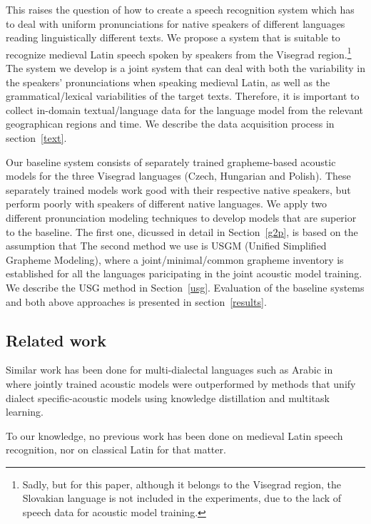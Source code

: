 \documentclass[runningheads,a4paper]{llncs}
\begin{document}
This raises the question of how to create a speech recognition system which has to deal with uniform pronunciations for native speakers of different languages reading linguistically different texts.
We propose a system that is suitable to recognize medieval Latin speech spoken by speakers from the Visegrad region.\footnote{Sadly, but for this paper, although it belongs to the Visegrad region, the Slovakian language is not included in the experiments, due to the lack of speech data for acoustic model training.}
The system we develop is a joint system that can deal with both the variability in the speakers' pronunciations when speaking medieval Latin, as well as the grammatical/lexical variabilities of the target texts.
Therefore, it is important to collect in-domain textual/language data for the language model from the relevant geographican regions and time.
We describe the data acquisition process in section~\ref{text}.

Our baseline system consists of separately trained grapheme-based acoustic models for the three Visegrad languages (Czech, Hungarian and Polish). 
These separately trained models work good with their respective native speakers, but perform poorly with speakers of different native languages.
We apply two different pronunciation modeling techniques to develop models that are superior to the baseline.
The first one, dicussed in detail in Section~\ref{g2p}, is based on the assumption that 
The second method we use is USGM (Unified Simplified Grapheme Modeling), where a joint/minimal/common grapheme inventory is established for all the languages paricipating in the joint acoustic model training.
We describe the USG method in Section~\ref{usg}.
Evaluation of the baseline systems and both above approaches is presented in section~\ref{results}.

\subsection{Related work}
Similar work has been done for multi-dialectal languages such as Arabic in~\cite{elfeky16} where jointly trained acoustic models were outperformed by methods that unify dialect specific-acoustic models using knowledge distillation and multitask learning.

To our knowledge, no previous work has been done on medieval Latin speech recognition, nor on classical Latin for that matter.
\end{document}
